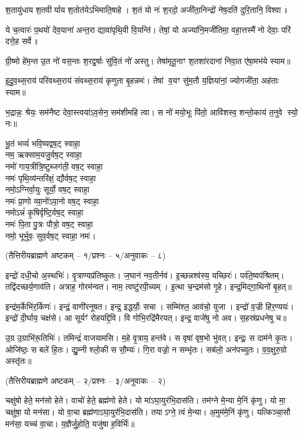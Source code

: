 श॒तायु॑धाय श॒तवीर्याय श॒तोत॑येऽभिमाति॒षाहे।
श॒तं यो नः॑ श॒रदो॒ अजी॑ता॒निन्द्रो॑ नेष॒दति॑ दुरि॒तानि॒ विश्वा॥

ये च॒त्वारः॑ प॒थयो॑ देव॒याना॑ अन्त॒रा द्यावा॑पृथि॒वी वि॒यन्ति॑।
तेषां॒ यो अज्या॑नि॒मजी॑तिमा॒ वहा॒त्तस्मै॑ नो देवाः॒ परि॑ दत्ते॒ह सर्वे॥

ग्री॒ष्मो हे॑म॒न्त उ॒त नो॑ वस॒न्तः श॒रद्व॒र्षाः सु॑वि॒तं नो॑ अस्तु।
तेषा॑मृतू॒नाꣳ श॒तशा॑रदानां निवा॒त ए॑षा॒मभ॑ये स्याम॥

इ॒दु॒व॒थ्स॒राय॑ परिवथ्स॒राय॑ संवथ्स॒राय॑ कृणुता बृ॒हन्नमः॑।
तेषां व॒यꣳ सु॑म॒तौ य॒ज्ञिया॑नां॒ ज्योगजी॑ता॒ अह॑ताः स्याम॥

भ॒द्रान्नः॒ श्रेयः॒ सम॑नैष्ट देवा॒स्त्वया॑ऽव॒सेन॒ सम॑शीमहि त्वा।
स नो॑ मयो॒भूः पि॑तो॒ आवि॑शस्व॒ शन्तो॒काय॑ त॒नुवे स्यो॒ नः॥

भू॒तं भव्यं॑ भवि॒ष्यद्वष॒ट् स्वाहा॒\\
नम॒ ऋक्साम॒यजु॒र्वष॒ट् स्वाहा॒\\
नमो॑ गाय॒त्रीत्रि॒ष्टुब्जग॑ती॒ वष॒ट् स्वाहा॒\\
नमः॑ पृथि॒व्य॑न्तरि॑क्षं॒ द्यौर्वष॒ट् स्वाहा॒\\
नमो॒ऽग्निर्वा॒युः सूर्यो॒ वष॒ट् स्वाहा॒\\
नमः॑ प्रा॒णो व्या॒नो॑ऽपा॒नो वष॒ट् स्वाहा॒\\
नमोऽन्नं॑ कृ॒षिर्वृष्टि॒र्वष॒ट् स्वाहा॒\\
नमः॑ पि॒ता पु॒त्रः पौत्रो॒ वष॒ट् स्वाहा॒\\
नमो॒ भूर्भुवः॒ सुव॒र्वष॒ट् स्वाहा॒ नमः॑।

\centerline{\normalsize (तैत्तिरीयब्राह्मणे अष्टकम् – १/प्रश्नः – ५/अनुवाकः – ८)}

इन्द्रो॑ दधी॒चो अ॒स्थभिः॑।
वृ॒त्राण्यप्र॑तिष्कुतः।
ज॒घान॑ नव॒तीर्नव॑।
इ॒च्छन्नश्व॑स्य॒ यच्छिरः॑।
पर्व॑ते॒ष्वप॑श्रितम्।
तद्वि॑दच्छर्य॒णाव॑ति।
अत्राह॒ गोरम॑न्वत।
नाम॒ त्वष्टु॑रपी॒च्यम्।
इ॒त्था च॒न्द्रम॑सो गृ॒हे।
इन्द्र॒मिद्गा॒थिनो॑ बृ॒हत्॥

इन्द्र॑म॒र्केभि॑र॒र्किणः॑।
इन्द्रं॒ वाणी॑रनूषत।
इन्द्र॒ इद्धर्योः॒ सचा।
सम्मि॑श्ल॒ आव॑चो॒ युजा।
इन्द्रो॑ व॒ज्री हि॑र॒ण्ययः॑।
इन्द्रो॑ दी॒र्घाय॒ चक्ष॑से।
आ सूर्यꣳ॑ रोहयद्दि॒वि।
वि गोभि॒रद्रि॑मैरयत्।
इन्द्र॒ वाजे॑षु नो अव।
स॒हस्र॑प्रधनेषु च॥

उ॒ग्र उ॒ग्राभि॑रू॒तिभिः॑।
तमिन्द्रं॑ वाजयामसि।
म॒हे वृ॒त्राय॒ हन्त॑वे।
स वृषा॑ वृष॒भो भु॑वत्।
इन्द्रः॒ स दाम॑ने कृ॒तः।
ओजि॑ष्ठः॒ स बले॑ हि॒तः।
द्यु॒म्नी श्लो॒की स सौ॒म्यः॑।
गि॒रा वज्रो॒ न सम्भृ॑तः।
सब॑लो॒ अन॑पच्युतः।
व॒व॒क्षुरु॒ग्रो अस्तृ॑तः॥

\centerline{\normalsize (तैत्तिरीयब्राह्मणे अष्टकम् – २/प्रश्नः – ३/अनुवाकः – २)}
चक्षु॑षो हेते॒ मन॑सो हेते।
वाचो॑ हेते॒ ब्रह्म॑णो हेते।
यो मा॑ऽघा॒युर॑भि॒दास॑ति।
तम॑ग्ने मे॒न्या मे॒निं कृ॑णु।
यो मा॒ चक्षु॑षा॒ यो मन॑सा।
यो वा॒चा ब्रह्म॑णाऽघा॒युर॑भि॒दास॑ति।
तयाऽग्ने॒ त्वं मे॒न्या।
अ॒मुम॑मे॒निं कृ॑णु।
यत्किञ्चा॒सौ मन॑सा॒ यच्च॑ वा॒चा।
य॒ज्ञैर्जु॒होति॒ यजु॑षा ह॒विर्भिः॑॥

